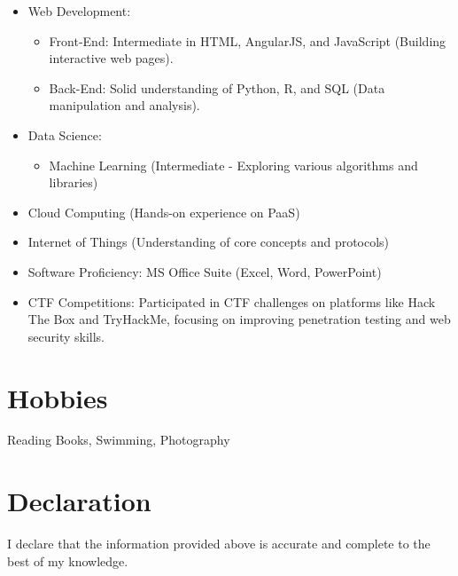 \documentclass[letterpaper,10pt]{article}
\begin{document}
\begin{multicols}{2}
\begin{itemize}
  \item Web Development:
    \begin{itemize}
      \item Front-End: Intermediate in HTML, AngularJS, and JavaScript (Building interactive web pages).
      \item Back-End: Solid understanding of Python, R, and SQL (Data manipulation and analysis).
    \end{itemize}
  \item Data Science:
    \begin{itemize}
      \item Machine Learning (Intermediate - Exploring various algorithms and libraries)
    \end{itemize}
  \item Cloud Computing (Hands-on experience on PaaS)
  \item Internet of Things (Understanding of core concepts and protocols)
  \item Software Proficiency: MS Office Suite (Excel, Word, PowerPoint)
   \item CTF Competitions: Participated in CTF challenges on platforms like Hack The Box and TryHackMe, focusing on improving penetration testing and web security skills.
\end{itemize}



\section*{Hobbies}
Reading Books, Swimming, Photography

\section*{Declaration}
I declare that the information provided above is accurate and complete to the best of my knowledge.

\end{multicols}
\end{document}
